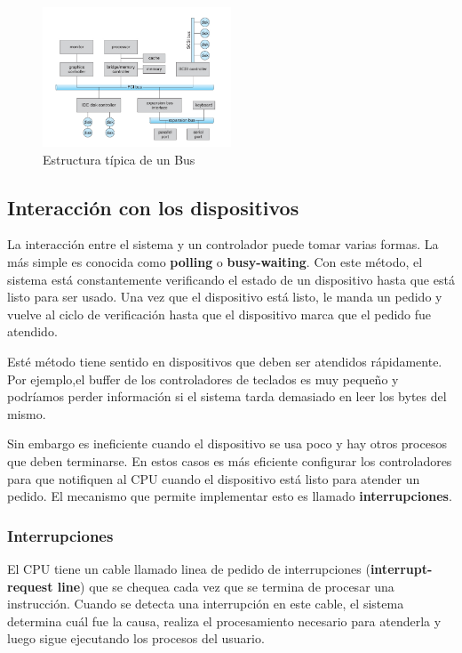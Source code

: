 \begin{figure}[h]
	\centering
	\includegraphics[width=0.5\textwidth]{imagenes/estructura-basica-bus}
	\caption{Estructura típica de un Bus}
	\label{fig:estructura-basica-bus}
\end{figure}

\subsection{Interacción con los dispositivos}
La interacción entre el sistema y un controlador puede tomar varias formas. La más simple es conocida como \textbf{polling} o \textbf{busy-waiting}. Con este método, el sistema está constantemente verificando el estado de un dispositivo hasta que está listo para ser usado. Una vez que el dispositivo está listo, le manda un pedido y vuelve al ciclo de verificación hasta que el dispositivo marca que el pedido fue atendido.

Esté método tiene sentido en dispositivos que deben ser atendidos rápidamente. Por ejemplo,el buffer de los controladores de teclados es muy pequeño y podríamos perder información si el sistema tarda demasiado en leer los bytes del mismo.

Sin embargo es ineficiente cuando el dispositivo se usa poco y hay otros procesos que deben terminarse. En estos casos es más eficiente configurar los controladores para que notifiquen al CPU cuando el dispositivo está listo para atender un pedido. El mecanismo que permite implementar esto es llamado \textbf{interrupciones}.

\subsubsection{Interrupciones}
El CPU tiene un cable llamado linea de pedido de interrupciones (\textbf{interrupt-request line}) que se chequea cada vez que se termina de procesar una instrucción. Cuando se detecta una interrupción en este cable, el sistema determina cuál fue la causa, realiza el procesamiento necesario para atenderla y luego sigue ejecutando los procesos del usuario.

